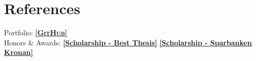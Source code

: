 \documentclass[11pt,a4paper,sans,colorlinks,linkcolor=blue,urlcolor=blue]{moderncv}
\begin{document}
\section{References}
Portfolio: \underline{\href{https://github.com/Thelin90}{\textbf{\textsc{[GitHub]}}}}\\
Honors \& Awards: \href{https://www.hms-networks.com/work/in/sweden/hms-scholarship}{\textbf{\underline{[Scholarship - Best Thesis]}}} \href{http://www.hh.se/omhogskolan/aktuellt/nyheter/nyheter/studenterbelonasavsparbanksstiftelsenkronan.65446700.html}{\textbf{\underline{[Scholarship - Sparbanken Kronan]}}}

     
     
\vfill
\enlargethispage{\footskip}
\end{document}
